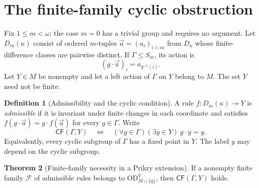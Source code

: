 \documentclass[11pt,letterpaper]{article}
\theoremstyle{definition}
\newtheorem{definition}{Definition}[section]
\newtheorem{theorem}[definition]{Theorem}
\numberwithin{equation}{section}
\newcommand{\OD}{\mathrm{OD}}
\newcommand{\CF}{\mathsf{CF}}
\newcommand{\ODg}{\OD_{M\cup\{q\}}^{V}}
\begin{document}
\section{The finite-family cyclic obstruction}\label{sec:necessity}

Fix $1\le m<\omega$; the case $m=0$ has a trivial group and requires no argument.
Let $D_m(\kappa)$ consist of ordered $m$-tuples
$\vec a=(a_i)_{i<m}$ from $D_\kappa$ whose finite-difference classes are
pairwise distinct. If $\Gamma\le S_m$, its action is
\[
 (g\cdot\vec a)_i=a_{g^{-1}(i)}.
\]
Let $Y\in M$ be nonempty and let a left action of $\Gamma$ on $Y$ belong to
$M$. The set $Y$ need not be finite.

\begin{definition}[Admissibility and the cyclic condition]\label{def:admissible}
A rule $f:D_m(\kappa)\to Y$ is \emph{admissible} if it is invariant under
finite changes in each coordinate and satisfies
$f(g\cdot\vec a)=g\cdot f(\vec a)$ for every $g\in\Gamma$.
Write
\[
 \CF(\Gamma,Y)\quad\Longleftrightarrow\quad
       (\forall g\in\Gamma)(\exists y\in Y)\ g\cdot y=y.
\]
Equivalently, every cyclic subgroup of $\Gamma$ has a fixed point in $Y$.
The label $y$ may depend on the cyclic subgroup.
\end{definition}

\begin{theorem}[Finite-family necessity in a Prikry extension]\label{thm:necessity}
If a nonempty finite family $\mathcal F$ of admissible rules belongs to
$\ODg$, then $\CF(\Gamma,Y)$ holds.
\end{theorem}
\end{document}
